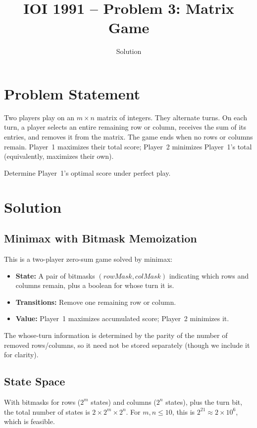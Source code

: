 \documentclass[11pt,a4paper]{article}
\title{IOI 1991 -- Problem 3: Matrix Game}
\author{Solution}
\date{}
\begin{document}
\maketitle

\section{Problem Statement}

Two players play on an $m \times n$ matrix of integers. They alternate turns.
On each turn, a player selects an entire remaining row or column, receives
the sum of its entries, and removes it from the matrix. The game ends when no
rows or columns remain. Player~1 maximizes their total score; Player~2
minimizes Player~1's total (equivalently, maximizes their own).

Determine Player~1's optimal score under perfect play.

\section{Solution}

\subsection{Minimax with Bitmask Memoization}

This is a two-player zero-sum game solved by minimax:

\begin{itemize}
  \item \textbf{State:} A pair of bitmasks $(\textit{rowMask},
    \textit{colMask})$ indicating which rows and columns remain, plus a
    boolean for whose turn it is.
  \item \textbf{Transitions:} Remove one remaining row or column.
  \item \textbf{Value:} Player~1 maximizes accumulated score; Player~2
    minimizes it.
\end{itemize}

The whose-turn information is determined by the parity of the number of
removed rows/columns, so it need not be stored separately (though we include
it for clarity).

\subsection{State Space}

With bitmasks for rows ($2^m$ states) and columns ($2^n$ states), plus the
turn bit, the total number of states is $2 \times 2^m \times 2^n$. For
$m, n \le 10$, this is $2^{21} \approx 2 \times 10^6$, which is feasible.
\end{document}
